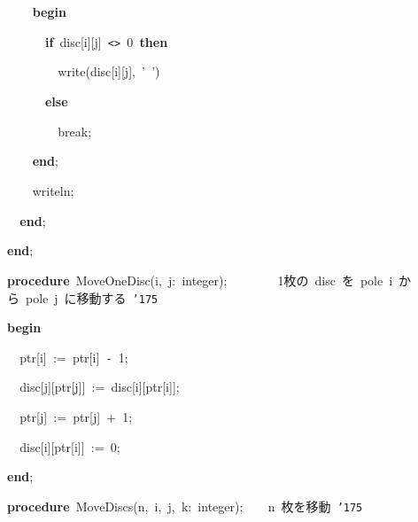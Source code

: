 \documentclass{article}
\begin{document}
\noindent
\mbox{}{\tt\mc \ \ \ \ }{\textbf{b}}{\textbf{e}}{\textbf{g}}{\textbf{i}}{\textbf{n}}

\noindent
\mbox{}{\tt\mc \ \ \ \ \ \ }{\textbf{i}}{\textbf{f}}{\tt\mc \ }disc[i][j]{\tt\mc \ }{\tt <}{\tt >}{\tt\mc \ }0{\tt\mc \ }{\textbf{t}}{\textbf{h}}{\textbf{e}}{\textbf{n}}

\noindent
\mbox{}{\tt\mc \ \ \ \ \ \ \ \ }write(disc[i][j],{\tt\mc \ }'{\tt\mc \ }')

\noindent
\mbox{}{\tt\mc \ \ \ \ \ \ }{\textbf{e}}{\textbf{l}}{\textbf{s}}{\textbf{e}}

\noindent
\mbox{}{\tt\mc \ \ \ \ \ \ \ \ }break;

\noindent
\mbox{}{\tt\mc \ \ \ \ }{\textbf{e}}{\textbf{n}}{\textbf{d}};

\noindent
\mbox{}{\tt\mc \ \ \ \ }writeln;

\noindent
\mbox{}{\tt\mc \ \ }{\textbf{e}}{\textbf{n}}{\textbf{d}};

\noindent
\mbox{}{\textbf{e}}{\textbf{n}}{\textbf{d}};

\noindent
\mbox{}\hfill

\noindent
\mbox{}{\textbf{p}}{\textbf{r}}{\textbf{o}}{\textbf{c}}{\textbf{e}}{\textbf{d}}{\textbf{u}}{\textbf{r}}{\textbf{e}}{\tt\mc \ }MoveOneDisc(i,{\tt\mc \ }j:{\tt\mc \ }integer);{\tt\mc \ \ \ \ \ \ \ }\rm{}\ 1枚の\ disc\ を\ pole\ i\ から\ pole\ j\ に移動する\ {\tt\char'175}
\tt\mc 

\noindent
\mbox{}{\textbf{b}}{\textbf{e}}{\textbf{g}}{\textbf{i}}{\textbf{n}}

\noindent
\mbox{}{\tt\mc \ \ }ptr[i]{\tt\mc \ }:={\tt\mc \ }ptr[i]{\tt\mc \ }{\tt -}{\tt\mc \ }1;

\noindent
\mbox{}{\tt\mc \ \ }disc[j][ptr[j]]{\tt\mc \ }:={\tt\mc \ }disc[i][ptr[i]];

\noindent
\mbox{}{\tt\mc \ \ }ptr[j]{\tt\mc \ }:={\tt\mc \ }ptr[j]{\tt\mc \ }+{\tt\mc \ }1;

\noindent
\mbox{}{\tt\mc \ \ }disc[i][ptr[i]]{\tt\mc \ }:={\tt\mc \ }0;

\noindent
\mbox{}{\textbf{e}}{\textbf{n}}{\textbf{d}};

\noindent
\mbox{}\hfill

\noindent
\mbox{}{\textbf{p}}{\textbf{r}}{\textbf{o}}{\textbf{c}}{\textbf{e}}{\textbf{d}}{\textbf{u}}{\textbf{r}}{\textbf{e}}{\tt\mc \ }MoveDiscs(n,{\tt\mc \ }i,{\tt\mc \ }j,{\tt\mc \ }k:{\tt\mc \ }integer);{\tt\mc \ \ \ }\rm{}\ n\ 枚を移動\ {\tt\char'175}
\tt\mc 
\end{document}
